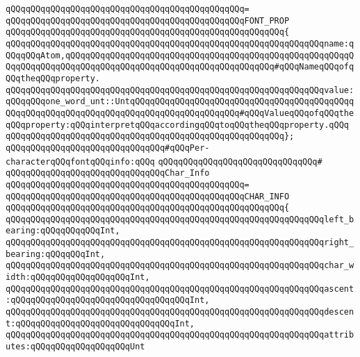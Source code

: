 \verb|qQQqqQQqqQQqqQQqqQQqqQQqqQQqqQQqqQQqqQQqqQQqqQQq=|\newline
\verb|qQQqqQQqqQQqqQQqqQQqqQQqqQQqqQQqqQQqqQQqqQQqqQQqFONT_PROP|\newline
\verb|qQQqqQQqqQQqqQQqqQQqqQQqqQQqqQQqqQQqqQQqqQQqqQQqqQQqqQQq{|\newline
\verb|qQQqqQQqqQQqqQQqqQQqqQQqqQQqqQQqqQQqqQQqqQQqqQQqqQQqqQQqqQQqqQQqname:qQQqqQQqAtom,qQQqqQQqqQQqqQQqqQQqqQQqqQQqqQQqqQQqqQQqqQQqqQQqqQQqqQQqqQQqqQQqqQQqqQQqqQQqqQQqqQQqqQQqqQQqqQQqqQQqqQQqqQQqqQQq#qQQqNameqQQqofqQQqtheqQQqproperty.|\newline
\verb|qQQqqQQqqQQqqQQqqQQqqQQqqQQqqQQqqQQqqQQqqQQqqQQqqQQqqQQqqQQqqQQqvalue:qQQqqQQqone_word_unt::UntqQQqqQQqqQQqqQQqqQQqqQQqqQQqqQQqqQQqqQQqqQQqqQQqqQQqqQQqqQQqqQQqqQQqqQQqqQQqqQQqqQQqqQQqqQQq#qQQqValueqQQqofqQQqtheqQQqproperty:qQQqinterpretqQQqaccordingqQQqtoqQQqtheqQQqproperty.qQQq|\newline
\verb|qQQqqQQqqQQqqQQqqQQqqQQqqQQqqQQqqQQqqQQqqQQqqQQqqQQqqQQq};|\newline
\newline
\verb|qQQqqQQqqQQqqQQqqQQqqQQqqQQqqQQq#qQQqPer-characterqQQqfontqQQqinfo:qQQq|\newline
\verb|qQQqqQQqqQQqqQQqqQQqqQQqqQQqqQQq#|\newline
\verb|qQQqqQQqqQQqqQQqqQQqqQQqqQQqqQQqChar_Info|\newline
\verb|qQQqqQQqqQQqqQQqqQQqqQQqqQQqqQQqqQQqqQQqqQQqqQQq=|\newline
\verb|qQQqqQQqqQQqqQQqqQQqqQQqqQQqqQQqqQQqqQQqqQQqqQQqCHAR_INFO|\newline
\verb|qQQqqQQqqQQqqQQqqQQqqQQqqQQqqQQqqQQqqQQqqQQqqQQqqQQqqQQq{|\newline
\verb|qQQqqQQqqQQqqQQqqQQqqQQqqQQqqQQqqQQqqQQqqQQqqQQqqQQqqQQqqQQqqQQqleft_bearing:qQQqqQQqqQQqInt,|\newline
\verb|qQQqqQQqqQQqqQQqqQQqqQQqqQQqqQQqqQQqqQQqqQQqqQQqqQQqqQQqqQQqqQQqright_bearing:qQQqqQQqInt,|\newline
\verb|qQQqqQQqqQQqqQQqqQQqqQQqqQQqqQQqqQQqqQQqqQQqqQQqqQQqqQQqqQQqqQQqchar_width:qQQqqQQqqQQqqQQqqQQqInt,|\newline
\verb|qQQqqQQqqQQqqQQqqQQqqQQqqQQqqQQqqQQqqQQqqQQqqQQqqQQqqQQqqQQqqQQqascent:qQQqqQQqqQQqqQQqqQQqqQQqqQQqqQQqqQQqInt,|\newline
\verb|qQQqqQQqqQQqqQQqqQQqqQQqqQQqqQQqqQQqqQQqqQQqqQQqqQQqqQQqqQQqqQQqdescent:qQQqqQQqqQQqqQQqqQQqqQQqqQQqqQQqInt,|\newline
\verb|qQQqqQQqqQQqqQQqqQQqqQQqqQQqqQQqqQQqqQQqqQQqqQQqqQQqqQQqqQQqqQQqattributes:qQQqqQQqqQQqqQQqqQQqUnt|\newline
